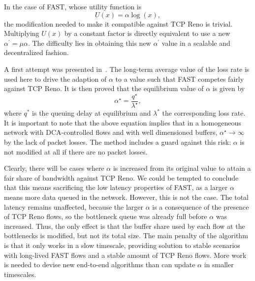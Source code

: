 \documentclass[english,times]{ettauth}
\begin{document}
In the case of FAST, whose utility function is
\begin{equation}
  \label{eq:FAST-utility}
  U(x) = \alpha \log(x),
\end{equation}
the modification needed to make it compatible against TCP Reno is trivial.
Multiplying $U(x)$ by a constant factor is directly equivalent to use a new
$\alpha^\prime = \mu \alpha$. The difficulty lies in obtaining this new
$\alpha^\prime$ value in a scalable and decentralized fashion.

A first attempt was presented in~\cite{Tang06}. The long-term average value of
the loss rate is used here to drive the adaption of $\alpha$ to a value such
that FAST competes fairly against TCP Reno. It is then proved that the
equilibrium value of $\alpha$ is given by
\begin{equation}
  \label{eq:alpha-adapted-to-reno}
  \alpha^\star = \frac{q^\star}{\lambda^\star},
\end{equation}
where $q^*$ is the queuing delay at equilibrium and $\lambda^*$ the
corresponding loss rate. It is important to note that the above equation
implies that in a homogeneous network with DCA-controlled flows and with well
dimensioned buffers, $\alpha^\star \rightarrow \infty$ by the lack of packet
losses. The method includes a guard against this risk: $\alpha$ is not
modified at all if there are no packet losses.

Clearly, there will be cases where $\alpha$ is increased from its original
value to attain a fair share of bandwidth against TCP Reno. We could be
tempted to conclude that this means sacrificing the low latency properties of
FAST, as a larger $\alpha$ means more data queued in the network. However,
this is not the case. The total latency remains unaffected, because the larger
$\alpha$ is a consequence of the presence of TCP Reno flows, so the bottleneck
queue was already full before $\alpha$ was increased. Thus, the only effect is
that the buffer share used by each flow at the bottlenecks is modified, but
not its total size. The main penalty of the algorithm is that it only works in
a slow timescale, providing solution to stable scenarios with long-lived FAST
flows and a stable amount of TCP Reno flows. More work is needed to devise new
end-to-end algorithms than can update $\alpha$ in smaller timescales.
\end{document}
